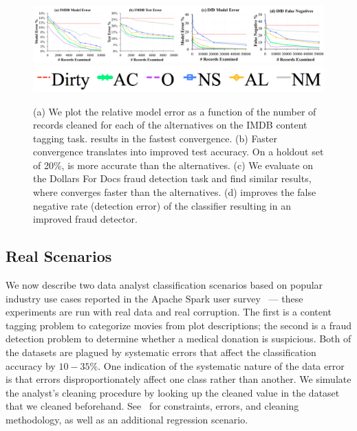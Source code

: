 \begin{figure}[t]
\centering
 \includegraphics[width=\textwidth]{exp/real-experiments-full.png}
 \includegraphics[width=0.6\columnwidth]{exp/legend-real.png}\vspace{-1em}
 \caption{(a) We plot the relative model error as a function of the number of records cleaned for each of the alternatives on the IMDB content tagging task. \sys results in the fastest convergence. (b) Faster convergence translates into improved test accuracy. On a holdout set of 20\%, \sys is more accurate than the alternatives. (c) We evaluate \sys on the Dollars For Docs fraud detection task and find similar results, where \sys converges faster than the alternatives. (d) \sys improves the false negative rate (detection error) of the classifier resulting in an improved fraud detector. \label{real}}\vspace{-1.5em}
\end{figure}

\subsection{Real Scenarios}\label{real-errors}
We now describe two data analyst classification scenarios based on popular industry use cases reported in the Apache Spark user survey~\cite{sparksurvey} --- these experiments are run with real data and real corruption.
The first is a content tagging problem to categorize movies from plot descriptions; 
the second is a fraud detection problem to  determine whether a medical donation is suspicious.
Both of the datasets are plagued by systematic errors that affect the classification accuracy by $10-35\%$.
One indication of the systematic nature of the data error is that errors disproportionately affect one class rather than another.
We simulate the analyst's cleaning procedure by looking up the cleaned value in the dataset that we cleaned beforehand.
See~\cite{activecleanarxiv} for constraints, errors, and cleaning methodology, as well as an additional regression scenario.


